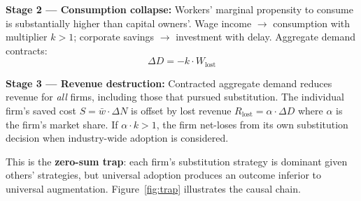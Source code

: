 \documentclass[conference]{IEEEtran}
\begin{document}
\textbf{Stage 2 --- Consumption collapse:}
Workers' marginal propensity to consume is substantially
higher than capital owners'. Wage income $\to$ consumption
with multiplier $k > 1$; corporate savings $\to$ investment
with delay. Aggregate demand contracts:
\begin{equation}
  \Delta D = -k \cdot W_{\text{lost}}
  \label{eq:demand_collapse}
\end{equation}

\textbf{Stage 3 --- Revenue destruction:}
Contracted aggregate demand reduces revenue for
\textit{all} firms, including those that pursued
substitution. The individual firm's saved cost
$S = \bar{w} \cdot \Delta N$ is offset by lost revenue
$R_{\text{lost}} = \alpha \cdot \Delta D$ where $\alpha$
is the firm's market share. If $\alpha \cdot k > 1$,
the firm net-loses from its own substitution decision
when industry-wide adoption is considered.

This is the \textbf{zero-sum trap}: each firm's
substitution strategy is dominant given others' strategies,
but universal adoption produces an outcome inferior
to universal augmentation. Figure~\ref{fig:trap} illustrates
the causal chain.
\end{document}
